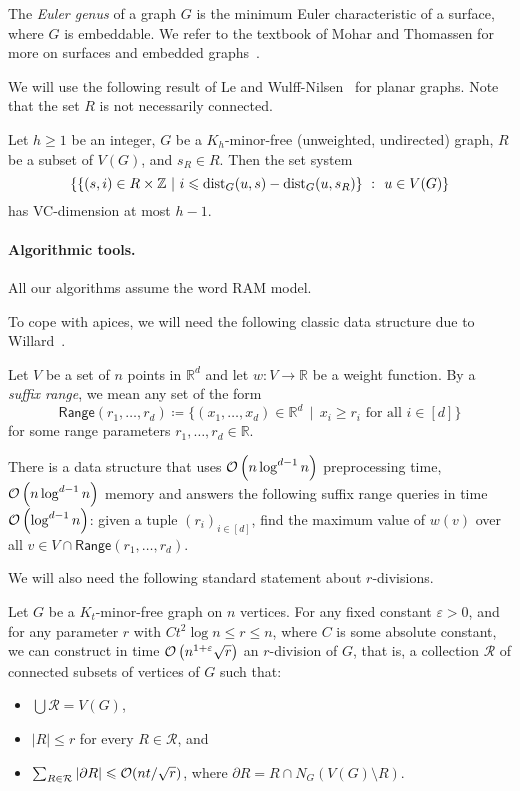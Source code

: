 The \emph{Euler genus} of a graph $G$ is the minimum Euler characteristic of a surface, where $G$ is embeddable.
We refer to the textbook of Mohar and Thomassen for more on surfaces and embedded graphs~\cite{MoharT01grap}.

We will use the following result of Le and Wulff-Nilsen~\cite[Theorem 1.3]{LeW24} for planar graphs. Note that the set $R$ is not necessarily connected.

\begin{theorem}\label{thm:LW}
  Let $h\ge 1$ be an integer, $G$ be a $K_h$-minor-free (unweighted, undirected) graph, $R$ be a subset of $V(G)$, and $s_R\in R$. Then the set system $$\left\{\left\{(s,i) \in R \times \mathbb{Z}~|~i \leqslant \mathrm{dist}_G(u,s)-\mathrm{dist}_G(u,s_R)\right\}~\colon~u \in V(G)\right\}$$
  has VC-dimension at most $h-1$.
\end{theorem}

\paragraph{Algorithmic tools.}
All our algorithms assume the word RAM model.

To cope with apices, we will need the following classic data structure due to Willard~\cite{Willard85}.
\begin{theorem}\label{t:orth_query}
Let $V$ be a set of $n$ points in $\mathbb{R}^d$ and let $w\colon V \to \mathbb{R}$ be a weight function. By a \emph{suffix range}, we mean any set of the form
$$\mathsf{Range}(r_1,\ldots,r_d)\coloneqq \{ (x_1, \dots, x_d) \in \mathbb{R}^d\,\mid\,x_i \geq r_i\textrm{ for all }i\in [d] \}$$ for some range parameters $r_1,\ldots,r_d\in \mathbb{R}$.

There is a data structure that uses $\mathcal{O}\left(n \log^{d - 1} n \right)$ preprocessing time, $\mathcal{O}\left( n \log^{d - 1} n \right)$ memory and answers the following suffix range queries in time $\mathcal{O} \left( \log^{d - 1} n \right)$:
given a tuple $(r_i)_{i \in [d]}$, find the maximum value of $w(v)$ over all
$v \in V\cap \mathsf{Range}(r_1,\ldots,r_d)$.
\end{theorem}

We will also need the following standard statement about $r$-divisions.

\begin{theorem}\label{t:r_division}
Let $G$ be a $K_t$-minor-free graph on $n$ vertices. For any fixed constant $\varepsilon > 0$, and for any parameter $r$ with $C t^2 \log n\leq r\leq  n$, where $C$ is some absolute constant, we can construct in time $\mathcal{O} \left( n^{1 + \varepsilon} \sqrt{r} \right)$ an $r$-division of $G$, that is, a collection $\mathcal{R}$ of connected subsets of vertices of $G$ such that:
\begin{itemize}[nosep]
\item $\bigcup \mathcal{R}=V(G)$,
\item $|R| \leq r$ for every $R \in \mathcal{R}$, and
\item $\sum_{R \in \mathcal{R}} |\partial R| \leqslant \mathcal{O}(nt / \sqrt{r})$,
where $\partial R = R \cap N_G(V(G) \setminus R)$.
\end{itemize}
\end{theorem}


